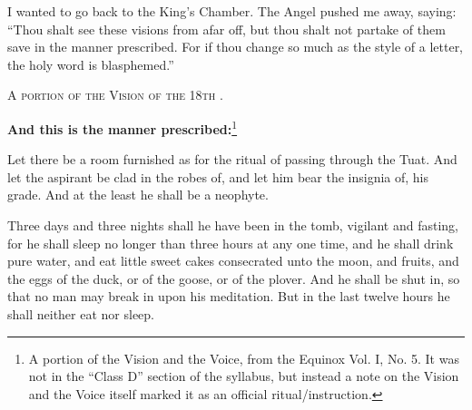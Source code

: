 \index{\AEthyr{}|(}
\epigraph{I wanted to go back to the King's Chamber. The Angel pushed me away, saying: \enquote{Thou shalt see these visions from afar off, but thou shalt not partake of them save in the manner prescribed. For if thou change so much as the style of a letter, the holy word is blasphemed.}}{\textsc{A portion of the Vision of the 18th \AEthyr{}.}}

\textbf{And this is the manner prescribed:}\footnote{A portion of the Vision and the Voice, from the Equinox Vol. I, No. 5. It was not in the \enquote{Class D} section of the \Argentium{} syllabus, but instead a note on the Vision and the Voice itself marked it as an official ritual/instruction.}

Let there be a room furnished as for the ritual of passing through the Tuat. And let the aspirant be clad in the robes of, and let him bear the insignia of, his grade. And at the least he shall be a neophyte.

Three days and three nights shall he have been in the tomb, vigilant and fasting, for he shall sleep no longer than three hours at any one time, and he shall drink pure water, and eat little sweet cakes consecrated unto the moon, and fruits, and the eggs of the duck, or of the goose, or of the plover. And he shall be shut in, so that no man may break in upon his meditation. But in the last twelve hours he shall neither eat nor sleep.

